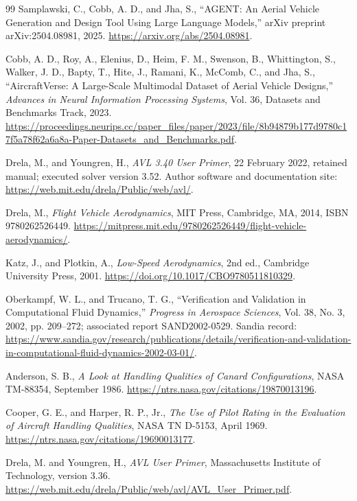 \begin{thebibliography}{99}
 Samplawski, C., Cobb, A. D., and Jha, S., ``AGENT: An Aerial Vehicle Generation and Design Tool Using Large Language Models,'' arXiv preprint arXiv:2504.08981, 2025. \url{https://arxiv.org/abs/2504.08981}.

 Cobb, A. D., Roy, A., Elenius, D., Heim, F. M., Swenson, B., Whittington, S., Walker, J. D., Bapty, T., Hite, J., Ramani, K., McComb, C., and Jha, S., ``AircraftVerse: A Large-Scale Multimodal Dataset of Aerial Vehicle Designs,'' \emph{Advances in Neural Information Processing Systems}, Vol. 36, Datasets and Benchmarks Track, 2023. \url{https://proceedings.neurips.cc/paper_files/paper/2023/file/8b94879b177d9780c17f5a78f62a6a8a-Paper-Datasets_and_Benchmarks.pdf}.

 Drela, M., and Youngren, H., \emph{AVL 3.40 User Primer}, 22 February 2022, retained manual; executed solver version 3.52. Author software and documentation site: \url{https://web.mit.edu/drela/Public/web/avl/}.

 Drela, M., \emph{Flight Vehicle Aerodynamics}, MIT Press, Cambridge, MA, 2014, ISBN 9780262526449. \url{https://mitpress.mit.edu/9780262526449/flight-vehicle-aerodynamics/}.

 Katz, J., and Plotkin, A., \emph{Low-Speed Aerodynamics}, 2nd ed., Cambridge University Press, 2001. \url{https://doi.org/10.1017/CBO9780511810329}.

 Oberkampf, W. L., and Trucano, T. G., ``Verification and Validation in Computational Fluid Dynamics,'' \emph{Progress in Aerospace Sciences}, Vol. 38, No. 3, 2002, pp. 209--272; associated report SAND2002-0529. Sandia record: \url{https://www.sandia.gov/research/publications/details/verification-and-validation-in-computational-fluid-dynamics-2002-03-01/}.

 Anderson, S. B., \emph{A Look at Handling Qualities of Canard Configurations}, NASA TM-88354, September 1986. \url{https://ntrs.nasa.gov/citations/19870013196}.

 Cooper, G. E., and Harper, R. P., Jr., \emph{The Use of Pilot Rating in the Evaluation of Aircraft Handling Qualities}, NASA TN D-5153, April 1969. \url{https://ntrs.nasa.gov/citations/19690013177}.

 Drela, M. and Youngren, H., \emph{AVL User Primer}, Massachusetts Institute of Technology, version 3.36. \url{https://web.mit.edu/drela/Public/web/avl/AVL_User_Primer.pdf}.


\end{thebibliography}
